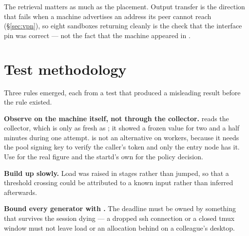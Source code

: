 The retrieval matters as much as the placement. Output transfer is the direction
that fails when a machine advertises an address its peer cannot reach
(\S\ref{sec:vpn}), so eight sandboxes returning cleanly is the check that the
interface pin was correct --- not the fact that the machine appeared in
.

\section{Test methodology}

Three rules emerged, each from a test that produced a misleading result before
the rule existed.

\textbf{Observe on the machine itself, not through the collector.}
 reads the collector, which is only as fresh as
; it showed a frozen value for two and a half minutes during
one attempt.  is not an alternative on workers,
because it needs the pool signing key to verify the caller's token and only the
entry node has it. Use  for the real figure and the startd's
own  for the policy decision.

\textbf{Build up slowly.} Load was raised in stages rather than jumped, so that a
threshold crossing could be attributed to a known input rather than inferred
afterwards.

\textbf{Bound every generator with .} The deadline must be owned by
something that survives the session dying --- a dropped ssh connection or a
closed tmux window must not leave load or an allocation behind on a colleague's
desktop.
